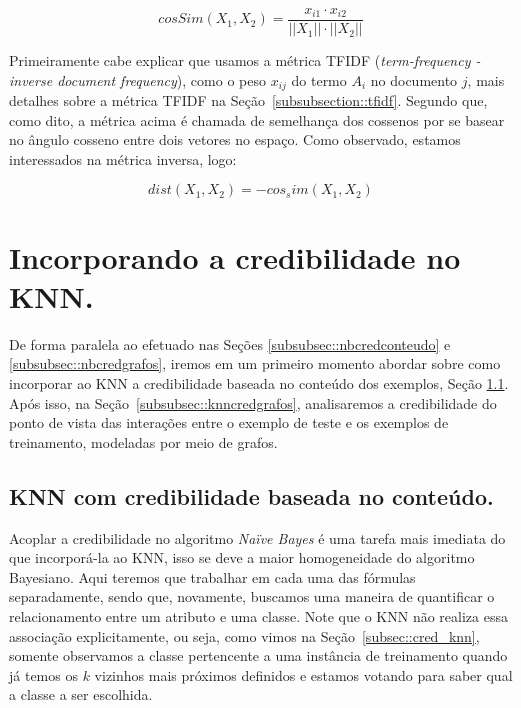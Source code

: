 \begin{itemize}
\begin{equation}\label{eqn::distancia_texto}
    cosSim(X_1, X_2) = \frac{  x_{i1} \cdot x_{i2} }{ ||X_1|| \cdot ||X_2|| }
\end{equation}

Primeiramente cabe explicar que usamos a métrica \textsc{TFIDF} (\textit{term-frequency - inverse document frequency}), como o peso $x_{ij}$ do termo $A_i$ no documento $j$, mais detalhes sobre a métrica \textsc{TFIDF} na Seção~\ref{subsubsection::tfidf}. Segundo que, como dito, a métrica acima é chamada de semelhança dos cossenos por se basear no ângulo cosseno entre dois vetores no espaço. Como observado, estamos interessados na métrica inversa, logo:
 
 \begin{equation}\label{eqn::distancia_texto}
    dist(X_1, X_2) = - cos_sim(X_1, X_2)
\end{equation}


\end{itemize}

\section{Incorporando a credibilidade no \textsc{KNN}.}
\label{subsubsec::knn_cred}

De forma paralela ao efetuado nas Seções \ref{subsubsec::nbcredconteudo} e \ref{subsubsec::nbcredgrafos}, iremos em um primeiro momento abordar sobre como incorporar ao \textsc{KNN} a credibilidade baseada no conteúdo dos exemplos, Seção \ref{subsubsec::knncredconteudo}. Após isso, na Seção~\ref{subsubsec::knncredgrafos}, analisaremos a credibilidade do ponto de vista das interações entre o exemplo de teste e os exemplos de treinamento, modeladas por meio de grafos.

\subsection{\textsc{KNN} com credibilidade baseada no conteúdo.}
\label{subsubsec::knncredconteudo}


Acoplar a credibilidade no algoritmo \textit{Naïve Bayes} é uma tarefa mais imediata do que incorporá-la ao \textsc{KNN}, isso se deve a maior homogeneidade do algoritmo Bayesiano. Aqui teremos que trabalhar em cada uma das fórmulas separadamente, sendo que, novamente, buscamos uma maneira de quantificar o relacionamento entre um atributo e uma classe. Note que o \textsc{KNN} não realiza essa associação explicitamente, ou seja, como vimos na Seção~\ref{subsec::cred_knn}, somente observamos a classe pertencente a uma instância de treinamento quando já temos os $k$ vizinhos mais próximos definidos e estamos votando para saber qual a classe a ser escolhida.


